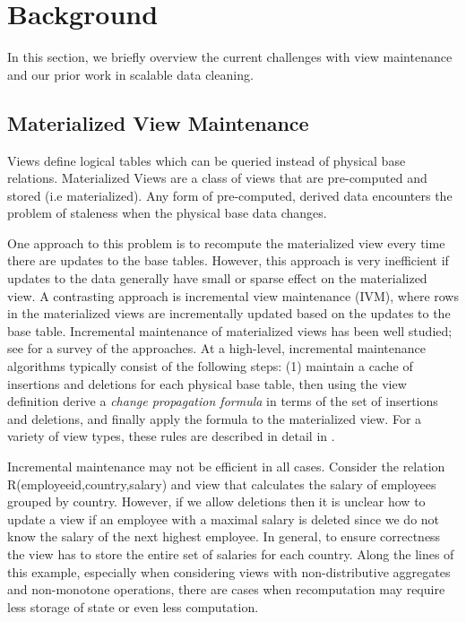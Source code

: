 \section{Background}\label{sec-background}
In this section, we briefly overview the current challenges with view maintenance and
our prior work in scalable data cleaning.

\subsection{Materialized View Maintenance}\label{subsec-inc}
Views define logical tables which can be queried instead of physical base relations.
Materialized Views are a class of views that are pre-computed and stored (i.e materialized).
Any form of pre-computed, derived data encounters the problem of staleness when the physical base data changes.

One approach to this problem is to recompute the materialized view every time there are updates to the base tables.
However, this approach is very inefficient if updates to the data generally have small or sparse effect on the materialized view. 
A contrasting approach is incremental view maintenance (IVM), where rows in the materialized views are incrementally updated based on the updates to the base table.
Incremental maintenance of materialized views has been well studied; see \cite{chirkova2011materialized} for a survey of the approaches. 
At a high-level, incremental maintenance algorithms typically consist of the following steps: (1) maintain a cache of insertions and deletions for each physical base table, then using the view definition derive a \emph{change propagation formula} in terms of the set of insertions and deletions, and finally apply the formula to the materialized view.
For a variety of view types, these rules are described in detail in \cite{DBLP:journals/vldb/KochAKNNLS14, DBLP:conf/pods/Koch10}.

Incremental maintenance may not be efficient in all cases.
Consider the relation R(employeeid,country,salary) and view that calculates the \maxfunc salary of employees grouped by country. 
However, if we allow deletions then it is unclear how to update a view if an employee with a maximal salary is deleted since we do not know the salary of the next highest employee. 
In general, to ensure correctness the view has to store the entire set of salaries for each country.
Along the lines of this example, especially when considering views with non-distributive aggregates and non-monotone operations, there are 
cases when recomputation may require less storage of state or even less computation.

